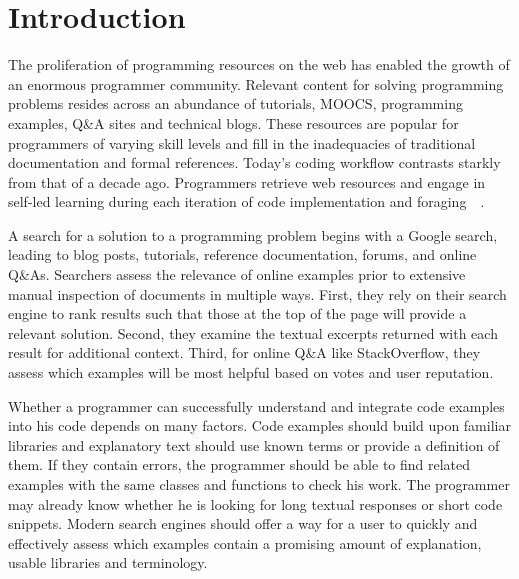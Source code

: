 \section{Introduction}


The proliferation of programming resources on the web has enabled the growth of an enormous programmer community.
Relevant content for solving programming problems resides across an abundance of tutorials, MOOCS, programming examples, Q\&A sites and technical blogs.
These resources are popular for programmers of varying skill levels and fill in the inadequacies of traditional documentation and formal references.
Today's coding workflow contrasts starkly from that of a decade ago.
Programmers retrieve web resources and engage in self-led learning during each iteration of code implementation and foraging~\cite{brandt_two_2009}~\cite{brandt_example-centric_2010}.

A search for a solution to a programming problem begins with a Google search, leading to blog posts, tutorials, reference documentation, forums, and online Q\&As.
Searchers assess the relevance of online examples prior to extensive manual inspection of documents in multiple ways.
First, they rely on their search engine to rank results such that those at the top of the page will provide a relevant solution.
Second, they examine the textual excerpts returned with each result for additional context.
Third, for online Q\&A like StackOverflow, they assess which examples will be most helpful based on votes and user reputation.

Whether a programmer can successfully understand and integrate code examples into his code depends on many factors.
Code examples should build upon familiar libraries and explanatory text should use known terms or provide a definition of them.
If they contain errors, the programmer should be able to find related examples with the same classes and functions to check his work.
The programmer may already know whether he is looking for long textual responses or short code snippets. 
Modern search engines should offer a way for a user to quickly and effectively assess which examples contain a promising amount of explanation, usable libraries and terminology.

